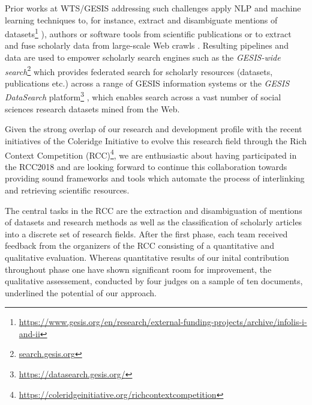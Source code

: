 Prior works at WTS/GESIS addressing such challenges apply NLP and machine learning techniques to, for instance, extract and disambiguate mentions of datasets\footnote{\url{https://www.gesis.org/en/research/external-funding-projects/archive/infolis-i-and-ii}} \cite{boland2012identifying,ghavimi2016semi}), authors \cite{conf/cikm/Backes18, conf/jcdl/Backes18} or software tools \cite{boland2019distant} from scientific publications or to extract and fuse scholarly data from large-scale Web crawls \cite{journals/semweb/YuGFLRD19, sahoo2015analysing}. Resulting pipelines and data are used to empower scholarly search engines such as the \textit{GESIS-wide search}\footnote{\url{search.gesis.org}}  \cite{conf/jcdl/HienertKBZM19} which provides federated search for scholarly resources (datasets, publications etc.) across a range of GESIS information systems or the \textit{GESIS DataSearch} platform\footnote{\url{https://datasearch.gesis.org/}} \cite{Krmer2018ADD}, which enables search across a vast number of social sciences research datasets mined from the Web. 

Given the strong overlap of our research and development profile with the recent initiatives of the Coleridge Initiative to evolve this research field through the Rich Context Competition (RCC)\footnote{\url{https://coleridgeinitiative.org/richcontextcompetition}}, we are enthusiastic about having participated in the RCC2018 and are looking forward to continue this collaboration towards providing sound frameworks and tools which automate the process of interlinking and retrieving scientific resources.

The central tasks in the RCC are the extraction and disambiguation of mentions of datasets and research methods as well as the classification of scholarly articles into a discrete set of research fields. After the first phase, each team received feedback from the organizers of the RCC consisting of a quantitative and qualitative evaluation. Whereas quantitative results of our inital contribution throughout phase one have shown significant room for improvement, the qualitative assessement, conducted by four judges on a sample of ten documents, underlined the potential of our approach. 


